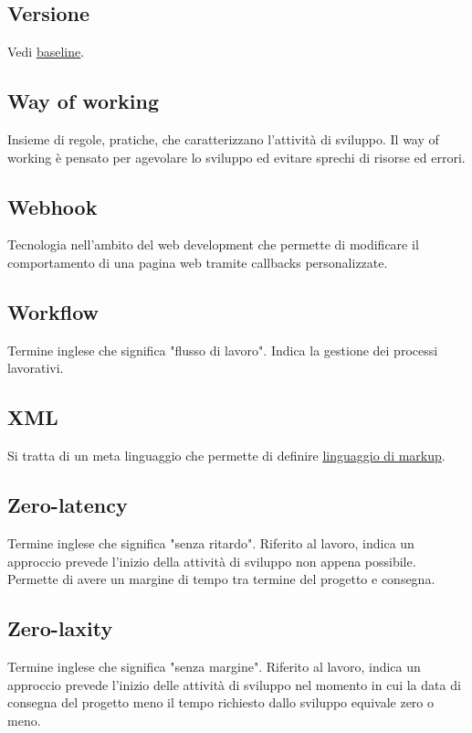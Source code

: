 	
	\subsection{Versione}
	\label{sec:versione}
	Vedi \underline{\hyperref[sec:baseline]{baseline}}.
	
	
	\newpage
	
	
	\subsection{Way of working}
	\label{sec:wow}
	Insieme di regole, pratiche, che caratterizzano l'attività di sviluppo. Il way of working è pensato per agevolare lo sviluppo ed evitare sprechi di risorse ed errori.

	
	\subsection{Webhook}
	\label{sec:webhook}
	Tecnologia nell'ambito del web development che permette di modificare il comportamento di una pagina web tramite callbacks personalizzate.


	\subsection{Workflow}
	\label{sec:workflow}
	Termine inglese che significa "flusso di lavoro". Indica la gestione dei processi lavorativi.

	 
	\newpage


	\subsection{XML}
	\label{sec:xml}
	Si tratta di un meta linguaggio che permette di definire \underline{\hyperref[sec:linguaggiomarkup]{linguaggio di markup}}.
	
	
	\newpage

	
	\subsection{Zero-latency}
	\label{sec:zerolatency}
	Termine inglese che significa "senza ritardo". Riferito al lavoro, indica un approccio prevede l'inizio della attività di sviluppo non appena possibile. Permette di avere un margine di tempo tra termine del progetto e consegna.

	
	\subsection{Zero-laxity}
	\label{sec:zerolaxity}
	Termine inglese che significa "senza margine". Riferito al lavoro, indica un approccio prevede l'inizio delle attività di sviluppo nel momento in cui la data di consegna del progetto meno il tempo richiesto dallo sviluppo equivale zero o meno.


